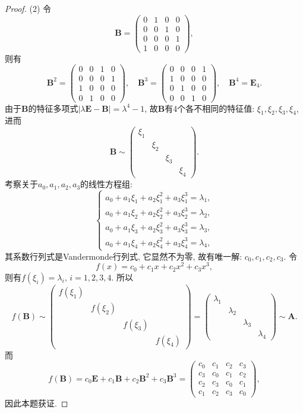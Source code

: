 \documentclass[../../main.tex]{subfiles}%
\begin{document}
\begin{proof}
(2) 令
$$
\boldsymbol{B} = \begin{pmatrix}
0 & 1 & 0 & 0 \\
0 & 0 & 1 & 0 \\
0 & 0 & 0 & 1 \\
1 & 0 & 0 & 0
\end{pmatrix},
$$
则有
$$
\boldsymbol{B}^2 = \begin{pmatrix}
0 & 0 & 1 & 0 \\
0 & 0 & 0 & 1 \\
1 & 0 & 0 & 0 \\
0 & 1 & 0 & 0
\end{pmatrix}, \quad \boldsymbol{B}^3 = \begin{pmatrix}
0 & 0 & 0 & 1 \\
1 & 0 & 0 & 0 \\
0 & 1 & 0 & 0 \\
0 & 0 & 1 & 0
\end{pmatrix}, \quad \boldsymbol{B}^4 = \boldsymbol{E}_4.
$$
由于$\boldsymbol{B}$的特征多项式$|\lambda \boldsymbol{E} - \boldsymbol{B}| = \lambda^4 - 1$, 故$\boldsymbol{B}$有4个各不相同的特征值: $\xi_1,\xi_2,\xi_3,\xi_4$, 进而
$$
\boldsymbol{B} \sim \begin{pmatrix}
\xi_1 & & & \\
& \xi_2 & & \\
& & \xi_3 & \\
& & & \xi_4
\end{pmatrix}.
$$
考察关于$a_0,a_1,a_2,a_3$的线性方程组:
$$
\begin{cases}
a_0 + a_1 \xi_1 + a_2 \xi_1^2 + a_3 \xi_1^3 = \lambda_1, \\
a_0 + a_1 \xi_2 + a_2 \xi_2^2 + a_3 \xi_2^3 = \lambda_2, \\
a_0 + a_1 \xi_3 + a_2 \xi_3^2 + a_3 \xi_3^3 = \lambda_3, \\
a_0 + a_1 \xi_4 + a_2 \xi_4^2 + a_3 \xi_4^3 = \lambda_4,
\end{cases}
$$
其系数行列式是Vandermonde行列式, 它显然不为零, 故有唯一解: $c_0,c_1,c_2,c_3$. 令
$$
f(x) = c_0 + c_1 x + c_2 x^2 + c_3 x^3,
$$
则有$f(\xi_i) = \lambda_i, \, i = 1,2,3,4$. 所以
$$
f(\boldsymbol{B}) \sim \begin{pmatrix}
f(\xi_1) & & & \\
& f(\xi_2) & & \\
& & f(\xi_3) & \\
& & & f(\xi_4)
\end{pmatrix} = \begin{pmatrix}
\lambda_1 & & & \\
& \lambda_2 & & \\
& & \lambda_3 & \\
& & & \lambda_4
\end{pmatrix} \sim \boldsymbol{A}.
$$
而
$$
f(\boldsymbol{B}) = c_0 \boldsymbol{E} + c_1 \boldsymbol{B} + c_2 \boldsymbol{B}^2 + c_3 \boldsymbol{B}^3 = \begin{pmatrix}
c_0 & c_1 & c_2 & c_3 \\
c_3 & c_0 & c_1 & c_2 \\
c_2 & c_3 & c_0 & c_1 \\
c_1 & c_2 & c_3 & c_0
\end{pmatrix},
$$
因此本题获证.
\end{proof}
\end{document}
